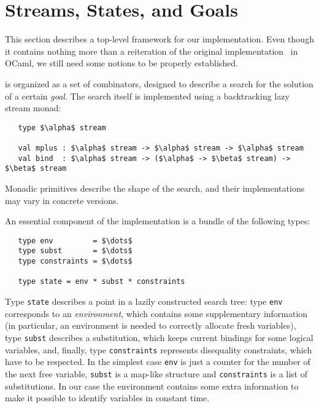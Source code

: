 \section{Streams, States, and Goals}
\label{sec:goals}

This section describes a top-level framework for our implementation. Even though it contains
nothing more than a reiteration of the original implementation~\cite{MicroKanren, CKanren}
in OCaml, we still need some notions to be properly established.

\miniKanren is organized as a set of combinators, designed to describe a search for
the solution of a certain \emph{goal}. The search itself is implemented using a
backtracking lazy stream monad:

\begin{lstlisting}
   type $\alpha$ stream

   val mplus : $\alpha$ stream -> $\alpha$ stream -> $\alpha$ stream
   val bind  : $\alpha$ stream -> ($\alpha$ -> $\beta$ stream) -> $\beta$ stream
\end{lstlisting}

Monadic primitives describe the shape of the search, and their implementations may
vary in concrete \miniKanren versions.

An essential component of the implementation is a bundle of the following types:

\begin{lstlisting}
   type env         = $\dots$
   type subst       = $\dots$
   type constraints = $\dots$

   type state = env * subst * constraints
\end{lstlisting}

Type \lstinline{state} describes a point in a lazily constructed search tree: type \lstinline{env} corresponds
to an \emph{environment}, which contains some supplementary information (in particular, an environment is needed to
correctly allocate fresh variables), type \lstinline{subst} describes a substitution, which keeps current bindings
for some logical variables, and, finally, type \lstinline{constraints} represents disequality constraints,
which have to be respected. In the simplest case \lstinline{env} is just a counter for the number of the next free
variable, \lstinline{subst} is a map-like structure and \lstinline{constraints} is a list of substitutions. In our
case the environment contains some extra information to make it possible to identify variables in constant time.

